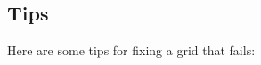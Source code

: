 \documentclass[xcolor=rgb,svgnames,dvipsnames]{article}
\newcommand{\figures}{\homeHenshaw/OvertureFigures}
\begin{document}
% 
% 



\clearpage
\subsection{Tips}

Here are some tips for fixing a grid that fails:
\end{document}
